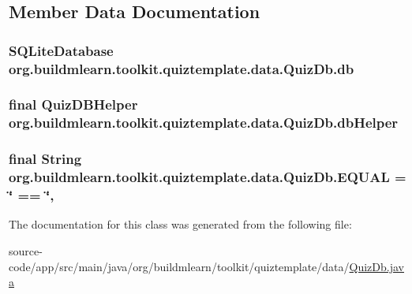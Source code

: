 \subsection{Member Data Documentation}
\subsubsection[{\texorpdfstring{db}{db}}]{\setlength{\rightskip}{0pt plus 5cm}S\+Q\+Lite\+Database org.\+buildmlearn.\+toolkit.\+quiztemplate.\+data.\+Quiz\+Db.\+db\hspace{0.3cm}{\ttfamily [private]}}\hypertarget{classorg_1_1buildmlearn_1_1toolkit_1_1quiztemplate_1_1data_1_1QuizDb_a279eb61d7a029a2081652a9fbd4dd104}{}\label{classorg_1_1buildmlearn_1_1toolkit_1_1quiztemplate_1_1data_1_1QuizDb_a279eb61d7a029a2081652a9fbd4dd104}
\subsubsection[{\texorpdfstring{db\+Helper}{dbHelper}}]{\setlength{\rightskip}{0pt plus 5cm}final Quiz\+D\+B\+Helper org.\+buildmlearn.\+toolkit.\+quiztemplate.\+data.\+Quiz\+Db.\+db\+Helper\hspace{0.3cm}{\ttfamily [private]}}\hypertarget{classorg_1_1buildmlearn_1_1toolkit_1_1quiztemplate_1_1data_1_1QuizDb_a01f990a27fc631fd0f7f53640d8d84be}{}\label{classorg_1_1buildmlearn_1_1toolkit_1_1quiztemplate_1_1data_1_1QuizDb_a01f990a27fc631fd0f7f53640d8d84be}
\subsubsection[{\texorpdfstring{E\+Q\+U\+AL}{EQUAL}}]{\setlength{\rightskip}{0pt plus 5cm}final String org.\+buildmlearn.\+toolkit.\+quiztemplate.\+data.\+Quiz\+Db.\+E\+Q\+U\+AL = \char`\"{} == \char`\"{}\hspace{0.3cm}{\ttfamily [static]}, {\ttfamily [private]}}\hypertarget{classorg_1_1buildmlearn_1_1toolkit_1_1quiztemplate_1_1data_1_1QuizDb_a1bb2eea4424a48bde643fd9745d1f961}{}\label{classorg_1_1buildmlearn_1_1toolkit_1_1quiztemplate_1_1data_1_1QuizDb_a1bb2eea4424a48bde643fd9745d1f961}


The documentation for this class was generated from the following file\+:\begin{DoxyCompactItemize}
\item 
source-\/code/app/src/main/java/org/buildmlearn/toolkit/quiztemplate/data/\hyperlink{QuizDb_8java}{Quiz\+Db.\+java}\end{DoxyCompactItemize}

